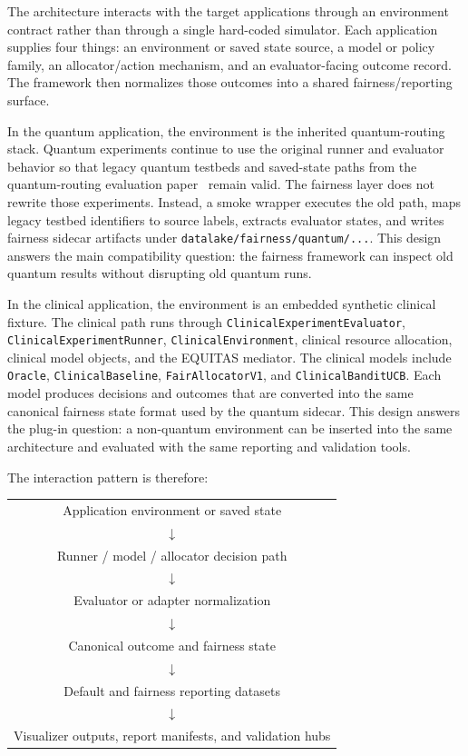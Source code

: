 \documentclass{IEEEtran}
\newcommand{\quantumPaper}{the quantum-routing evaluation paper~\cite{garcia2026threat_aware_quantum_routing}\xspace}
\begin{document}
The architecture interacts with the target applications through an environment contract rather than through a single hard-coded simulator. Each application supplies four things: an environment or saved state source, a model or policy family, an allocator/action mechanism, and an evaluator-facing outcome record. The framework then normalizes those outcomes into a shared fairness/reporting surface.

In the quantum application, the environment is the inherited quantum-routing stack. Quantum experiments continue to use the original runner and evaluator behavior so that legacy quantum testbeds and saved-state paths from \quantumPaper remain valid. The fairness layer does not rewrite those experiments. Instead, a smoke wrapper executes the old path, maps legacy testbed identifiers to source labels, extracts evaluator states, and writes fairness sidecar artifacts under \texttt{datalake/fairness/quantum/...}. This design answers the main compatibility question: the fairness framework can inspect old quantum results without disrupting old quantum runs.

In the clinical application, the environment is an embedded synthetic clinical fixture. The clinical path runs through \texttt{ClinicalExperimentEvaluator}, \texttt{ClinicalExperimentRunner}, \texttt{ClinicalEnvironment}, clinical resource allocation, clinical model objects, and the EQUITAS mediator. The clinical models include \texttt{Oracle}, \texttt{ClinicalBaseline}, \texttt{FairAllocatorV1}, and \texttt{ClinicalBanditUCB}. Each model produces decisions and outcomes that are converted into the same canonical fairness state format used by the quantum sidecar. This design answers the plug-in question: a non-quantum environment can be inserted into the same architecture and evaluated with the same reporting and validation tools.

The interaction pattern is therefore:

\begin{center}
\small
\begin{tabular}{c}
Application environment or saved state \\
$\downarrow$ \\
Runner / model / allocator decision path \\
$\downarrow$ \\
Evaluator or adapter normalization \\
$\downarrow$ \\
Canonical outcome and fairness state \\
$\downarrow$ \\
Default and fairness reporting datasets \\
$\downarrow$ \\
Visualizer outputs, report manifests, and validation hubs
\end{tabular}
\end{center}
\end{document}
